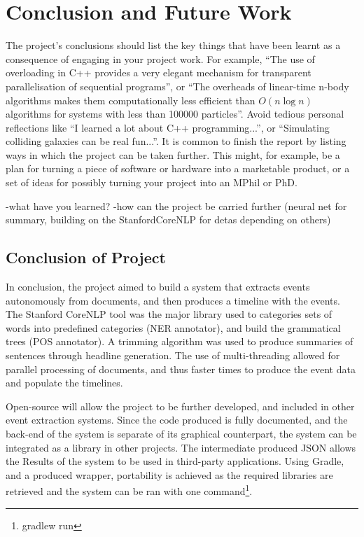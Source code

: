 \chapter{Conclusion and Future Work}

The project's conclusions should list the key things that have been learnt as a consequence of engaging in your project work. For example, ``The use of overloading in C++ provides a very elegant mechanism for transparent parallelisation of sequential programs'', or ``The overheads of linear-time n-body algorithms makes them computationally less efficient than $O(n \log n)$ algorithms for systems with less than 100000 particles''. Avoid tedious personal reflections like ``I learned a lot about C++ programming...'', or ``Simulating colliding galaxies can be real fun...''. It is common to finish the report by listing ways in which the project can be taken further. This might, for example, be a plan for turning a piece of software or hardware into a marketable product, or a set of ideas for possibly turning your project into an MPhil or PhD.

-what have you learned?
-how can the project be carried further (neural net for summary, building on the StanfordCoreNLP for detas depending on others)

\section{Conclusion of Project}
\par In conclusion, the project aimed to build a system that extracts events autonomously from documents, and then produces a timeline with the events. The Stanford CoreNLP tool was the major library used to categories sets of words into predefined categories (NER annotator), and build the grammatical trees (POS annotator). A trimming algorithm was used to produce summaries of sentences through headline generation. The use of multi-threading allowed for parallel processing of documents, and thus faster times to produce the event data and populate the timelines. 

\par Open-source will allow the project to be further developed, and included in other event extraction systems.  Since the code produced is fully documented, and the back-end of the system is separate of its graphical counterpart, the system can be integrated as a library in other projects. The intermediate produced JSON allows the Results of the system to be used in third-party applications. Using Gradle, and a produced wrapper, portability is achieved as the required libraries are retrieved and the system can be ran with one command\footnote{gradlew run}. 

